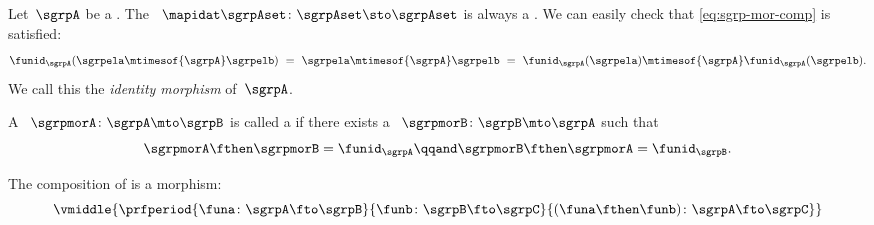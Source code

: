 \begin{ctdefinition}
    \label{def:identity-sgrp-mor}
    Let~$\sgrpA$ be a .
    The ~$\mapidat\sgrpAset\colon \sgrpAset \sto \sgrpAset$ is always a .
    We can easily check that \cref{eq:sgrp-mor-comp} is satisfied:
    \begin{equation}
        \label{eq:identity-sgrp-mor-proof}
        \funid_\sgrpA (\sgrpela \mtimesof{\sgrpA} \sgrpelb) \ = \ \sgrpela \mtimesof{\sgrpA} \sgrpelb
        \ = \
        \funid_\sgrpA (\sgrpela )\mtimesof{\sgrpA}\funid_\sgrpA(\sgrpelb).
    \end{equation}
    We call this the \emph{identity morphism} of~$\sgrpA$.
\end{ctdefinition}
\showslides{%
    \begin{forslides}
        \begin{equation}
            \label{eq:identity-sgrp}
            \funid_\sgrpA\colon \sgrpA \fto \sgrpA
        \end{equation}
    \end{forslides}
}



\begin{ctdefinition}
    \label{def:semigroup-isomorphism}
    A ~$\sgrpmorA\colon \sgrpA \mto \sgrpB$ is called a  if there exists a ~$\sgrpmorB\colon \sgrpB \mto \sgrpA$ such that
    \begin{equation}
        \label{eq:sgrp-iso-cond}
        \sgrpmorA \fthen \sgrpmorB = \funid_\sgrpA
        \qqand
        \sgrpmorB \fthen \sgrpmorA = \funid_\sgrpB.
    \end{equation}
\end{ctdefinition}

\begin{lemma}
    \label{lem:semigroup-morphisms-compose}
    The composition of  is a morphism:
    \begin{equation}
        \label{eq:sgrp-mor-compo}
        \vmiddle{
            \prfperiod{
                \funa \colon \sgrpA \fto \sgrpB
            }{
                \funb \colon \sgrpB \fto \sgrpC
            }{
                (\funa \fthen \funb) \colon \sgrpA \fto \sgrpC
            }
        }
    \end{equation}
\end{lemma}

